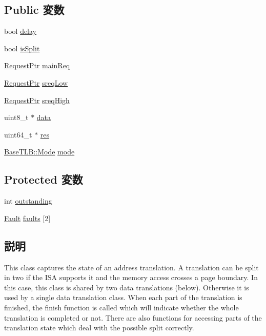 \subsection*{Public 変数}
\begin{DoxyCompactItemize}
\item 
bool \hyperlink{classWholeTranslationState_acde7c910d793a8d8913d949834c8c621}{delay}
\item 
bool \hyperlink{classWholeTranslationState_afd8e5886f3bd5827ade12fcaf8ea2a47}{isSplit}
\item 
\hyperlink{classRequest}{RequestPtr} \hyperlink{classWholeTranslationState_ae9cdcf9160e22de981af332c3f02a209}{mainReq}
\item 
\hyperlink{classRequest}{RequestPtr} \hyperlink{classWholeTranslationState_a8c06ecd03202f5de1fc60cf6194ff285}{sreqLow}
\item 
\hyperlink{classRequest}{RequestPtr} \hyperlink{classWholeTranslationState_a1464e1dd7de6d5752d05938f0b3bc171}{sreqHigh}
\item 
uint8\_\-t $\ast$ \hyperlink{classWholeTranslationState_abe222f6d3581e7920dcad5306cc906a8}{data}
\item 
uint64\_\-t $\ast$ \hyperlink{classWholeTranslationState_afd8a8bcfa588184183684cc5a1deeb5a}{res}
\item 
\hyperlink{classBaseTLB_a46c8a310cf4c094f8c80e1cb8dc1f911}{BaseTLB::Mode} \hyperlink{classWholeTranslationState_ae9b5adf8be89a72128708c7e621e7211}{mode}
\end{DoxyCompactItemize}
\subsection*{Protected 変数}
\begin{DoxyCompactItemize}
\item 
int \hyperlink{classWholeTranslationState_a3fc62072fe6e979a41b2e68bda15893a}{outstanding}
\item 
\hyperlink{classRefCountingPtr}{Fault} \hyperlink{classWholeTranslationState_a85850d6bc18d242fa1e8d4859e8d7d05}{faults} \mbox{[}2\mbox{]}
\end{DoxyCompactItemize}


\subsection{説明}
This class captures the state of an address translation. A translation can be split in two if the ISA supports it and the memory access crosses a page boundary. In this case, this class is shared by two data translations (below). Otherwise it is used by a single data translation class. When each part of the translation is finished, the finish function is called which will indicate whether the whole translation is completed or not. There are also functions for accessing parts of the translation state which deal with the possible split correctly. 

